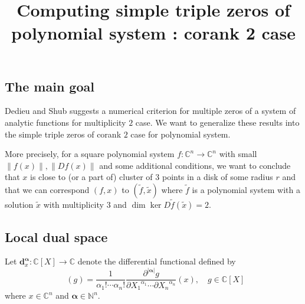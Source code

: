 \documentclass[12pt,oneside,reqno]{amsart}
\title{Computing simple triple zeros of polynomial system : corank 2 case}
\theoremstyle{definition}
\DeclareMathOperator{\diffop}{\mathbf{d}^\mathbf{\alpha}_x}
\begin{document}
\maketitle
\subsection{The main goal}
Dedieu and Shub \cite{dedieu2001simple} suggests a numerical criterion for multiple zeros of a system of analytic functions for multiplicity $2$ case. We want to generalize these results into the simple triple zeros of corank $2$ case for polynomial system.

More precisely, for a square polynomial system $f:\mathbb{C}^n\rightarrow \mathbb{C}^n$ with small $\|f(x)\|,\|Df(x)\|$ and some additional conditions, we want to conclude that $x$ is close to (or a part of) cluster of $3$ points in a disk of some radius $r$ and that we can correspond $(f,x)$ to $(\tilde{f},\tilde{x})$ where $\tilde{f}$ is a polynomial system with a solution $\tilde{x}$ with multiplicity $3$ and $\dim\ker D\tilde{f}(\tilde{x})=2$.

\subsection{Local dual space}
Let $\mathbf{d}^\mathbf{\alpha}_x :\mathbb{C}[X]\rightarrow \mathbb{C}$ denote the differential functional defined by
\[\diffop(g)=\frac{1}{\alpha_1!\cdots \alpha_n!}\frac{\partial^{|\mathbf{\alpha}|}g}{\partial {X_1}^{\alpha_1}\cdots \partial{X_n}^{\alpha_n}}(x), \quad g\in \mathbb{C}[X]\]
where $x\in \mathbb{C}^n$ and $\mathbf{\alpha}\in \mathbb{N}^n$.
\end{document}
